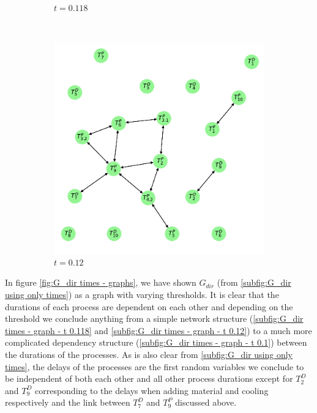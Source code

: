 \documentclass[../Thesis.tex]{subfiles}
\begin{document}
\begin{figure}[ht]
\begin{subfigure}[t]{0.43\linewidth}
        \caption{$t = 0.118$}
        \label{subfig:G_dir times - graph - t 0.118}
    \end{subfigure}
    \\[\baselineskip]
    \begin{subfigure}[t]{0.43\linewidth}
        \includegraphics[width = \linewidth]{figures/Cycle data/G_dir times as graph - symmetric - 0_12.pdf}
        \caption{$t=0.12$}
        \label{subfig:G_dir times - graph - t 0.12}
    \end{subfigure}
    \caption{}
    \label{fig:G_dir times - graphs}
\end{figure}

In figure \autoref{fig:G_dir times - graphs}, we have shown $G_{dir}$ (from \autoref{subfig:G_dir using only times}) as a graph with varying thresholds. It is clear that the durations of each process are dependent on each other and depending on the threshold we conclude anything from a simple network structure (\autoref{subfig:G_dir times - graph - t 0.118} and \autoref{subfig:G_dir times - graph - t 0.12}) to a much more complicated dependency structure (\autoref{subfig:G_dir times - graph - t 0.1}) between the durations of the processes. As is also clear from \autoref{subfig:G_dir using only times}, the delays of the processes are the first random variables we conclude to be independent of both each other and all other process durations except for $T^D_2$ and $T^D_9$ corresponding to the delays when adding material and cooling respectively and the link between $T^D_7$ and $T^P_9$ discussed above.
\end{document}
